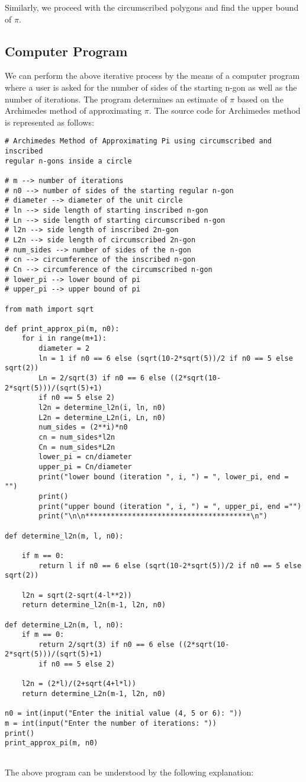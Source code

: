 \documentclass[12pt]{article}
\begin{document}
Similarly, we proceed with the circumscribed polygons and find the upper bound of $\pi$.

\subsection{Computer Program}  

We can perform the above iterative process by the means of a
computer program where a user is asked for the number of sides of the starting n-gon as well as the number of iterations. The program determines an
estimate of $\pi$ based on the Archimedes method of approximating $\pi$. The source
code for Archimedes method is represented as follows:

\begin{verbatim}
# Archimedes Method of Approximating Pi using circumscribed and inscribed
regular n-gons inside a circle

# m --> number of iterations
# n0 --> number of sides of the starting regular n-gon
# diameter --> diameter of the unit circle
# ln --> side length of starting inscribed n-gon
# Ln --> side length of starting circumscribed n-gon
# l2n --> side length of inscribed 2n-gon
# L2n --> side length of circumscribed 2n-gon
# num_sides --> number of sides of the n-gon
# cn --> circumference of the inscribed n-gon
# Cn --> circumference of the circumscribed n-gon
# lower_pi --> lower bound of pi
# upper_pi --> upper bound of pi

from math import sqrt

def print_approx_pi(m, n0):
    for i in range(m+1):
        diameter = 2
        ln = 1 if n0 == 6 else (sqrt(10-2*sqrt(5))/2 if n0 == 5 else sqrt(2))
        Ln = 2/sqrt(3) if n0 == 6 else ((2*sqrt(10-2*sqrt(5)))/(sqrt(5)+1)
        if n0 == 5 else 2)
        l2n = determine_l2n(i, ln, n0)
        L2n = determine_L2n(i, Ln, n0)
        num_sides = (2**i)*n0
        cn = num_sides*l2n
        Cn = num_sides*L2n
        lower_pi = cn/diameter
        upper_pi = Cn/diameter
        print("lower bound (iteration ", i, ") = ", lower_pi, end = "")
        print()
        print("upper bound (iteration ", i, ") = ", upper_pi, end ="")
        print("\n\n***************************************\n")
		
def determine_l2n(m, l, n0):

    if m == 0:
        return l if n0 == 6 else (sqrt(10-2*sqrt(5))/2 if n0 == 5 else sqrt(2))

    l2n = sqrt(2-sqrt(4-l**2))
    return determine_l2n(m-1, l2n, n0)
	
def determine_L2n(m, l, n0): 
    if m == 0:
        return 2/sqrt(3) if n0 == 6 else ((2*sqrt(10-2*sqrt(5)))/(sqrt(5)+1)
        if n0 == 5 else 2)
		
    l2n = (2*l)/(2+sqrt(4+l*l))
    return determine_L2n(m-1, l2n, n0)
	
n0 = int(input("Enter the initial value (4, 5 or 6): "))
m = int(input("Enter the number of iterations: "))
print()
print_approx_pi(m, n0)
	
\end{verbatim}
The above program can be understood by the following explanation:
\end{document}

